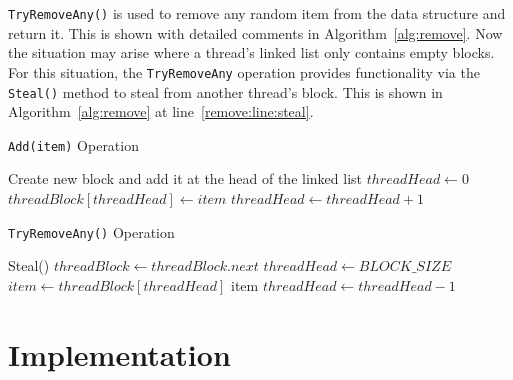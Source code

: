 \texttt{TryRemoveAny()} is used to remove any random item from the data structure and return it.
This is shown with detailed comments in Algorithm~\ref{alg:remove}.
Now the situation may arise where a thread's linked list only contains empty blocks.
For this situation, the \texttt{TryRemoveAny} operation provides functionality via the
\texttt{Steal()} method to steal from another thread's block. This is shown
in Algorithm~\ref{alg:remove} at line~\ref{remove:line:steal}.

\begin{algorithm}
\caption{\texttt{Add(item)} Operation}
\label{alg:add}
\begin{algorithmic}[1]
 
    \State Create new block and add it at the head of the linked list
    \State $threadHead \gets 0$
\EndIf
\State $threadBlock[threadHead] \gets item$ 
\State $threadHead \gets threadHead + 1$ 
\end{algorithmic}
\end{algorithm}

\begin{algorithm}
\caption{\texttt{TryRemoveAny()} Operation}
\label{alg:remove}
\begin{algorithmic}[1]
\Loop
         
            \State \Return Steal()  \label{remove:line:steal}
        \EndIf
        \State $threadBlock \gets threadBlock.next$ 
        \State $threadHead \gets BLOCK\_SIZE$ 
    \EndIf
    \State $item \gets threadBlock[threadHead]$ 
        \State \Return item 
    \Else
        \State $threadHead \gets threadHead - 1$ 
    \EndIf
\EndLoop
\end{algorithmic}
\end{algorithm}


\section{Implementation}



